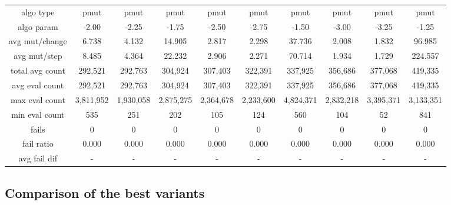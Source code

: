 \begin{tabular}[h]{cccccccccc}
algo type&                pmut&         pmut&         pmut&         pmut&         pmut&         pmut&         pmut&         pmut&         pmut\\
algo param&              -2.00&        -2.25&        -1.75&        -2.50&        -2.75&        -1.50&        -3.00&        -3.25&        -1.25\\
avg mut/change&          6.738&        4.132&       14.905&        2.817&        2.298&       37.736&        2.008&        1.832&       96.985\\
avg mut/step&            8.485&        4.364&       22.232&        2.906&        2.271&       70.714&        1.934&        1.729&      224.557\\
\hline
total avg count&       292,521&      292,763&      304,924&      307,403&      322,391&      337,925&      356,686&      377,068&      419,335\\
avg eval count&        292,521&      292,763&      304,924&      307,403&      322,391&      337,925&      356,686&      377,068&      419,335\\
max eval count&      3,811,952&    1,930,058&    2,875,275&    2,364,678&    2,233,600&    4,824,371&    2,832,218&    3,395,371&    3,133,351\\
min eval count&            535&          251&          202&          105&          124&          560&          104&           52&          841\\
\hline
fails&                       0&            0&            0&            0&            0&            0&            0&            0&            0\\
fail ratio&              0.000&        0.000&        0.000&        0.000&        0.000&        0.000&        0.000&        0.000&        0.000\\
avg fail dif&                -&            -&            -&            -&            -&            -&            -&            -&            -\\
\end{tabular}


\subsection{Comparison of the best variants}


